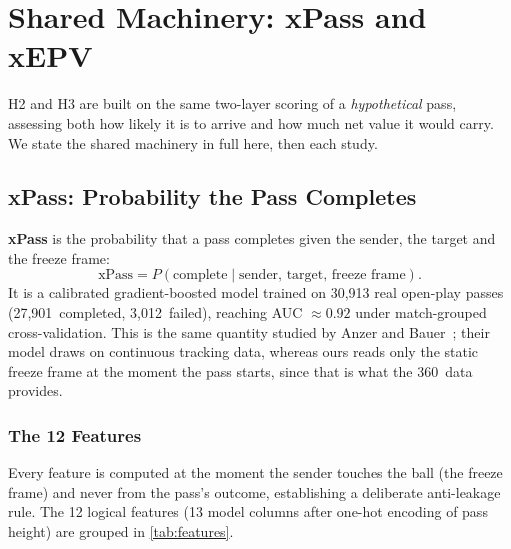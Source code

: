 \documentclass[12pt,a4paper]{article}
\begin{document}
\section{Shared Machinery: xPass and xEPV}\label{sec:shared}

H2 and H3 are built on the same two-layer scoring of a \emph{hypothetical} pass, assessing both how likely it is to arrive and how much net value it would carry.
We state the shared machinery in full here, then each study.

\subsection{xPass: Probability the Pass Completes}\label{sec:xpass}

\textbf{xPass} is the probability that a pass completes given the sender, the target and the freeze frame:
\begin{equation}\label{eq:xpass}
    \text{xPass} = P(\text{complete} \mid \text{sender, target, freeze frame}).
\end{equation}
It is a calibrated gradient-boosted model trained on 30,913 real open-play passes (27,901~completed, 3,012~failed), reaching AUC $\approx 0.92$ under match-grouped cross-validation.
This is the same quantity studied by Anzer and Bauer~\cite{xpasspaper}; their model draws on continuous tracking data, whereas ours reads only the static freeze frame at the moment the pass starts, since that is what the 360~data provides.

\subsubsection{The 12 Features}\label{sec:xpass-features}

Every feature is computed at the moment the sender touches the ball (the freeze frame) and never from the pass's outcome, establishing a deliberate anti-leakage rule.
The 12 logical features (13 model columns after one-hot encoding of pass height) are grouped in \cref{tab:features}.
\end{document}
